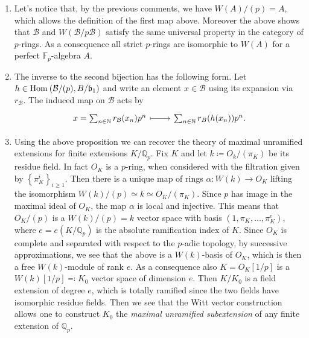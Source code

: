 \begin{rem}[]\leavevmode\vspace{-.2\baselineskip}
\begin{enumerate}
\item Let's notice that, by the previous comments, we have
	$W(A)/ (p) = A$, which allows the definition of the first map above.
	Moreover the above shows that $\mathcal{B}$ and $W(\mathcal{B}/p \mathcal{B})$
	satisfy the same universal property in the category of $p$-rings.
	As a consequence all strict $p$-rings are isomorphic to $W(A)$ for
	a perfect $\mathbb{F}_p$-algebra $A$.

\item The inverse to the second bijection has the following form.
	Let $h \in \operatorname{Hom}_{  } \left( \mathcal{B}/ (p), B/\mathfrak{b}_1 \right)$
	and write an element $x \in \mathcal{B}$ using its expansion via $r_{\mathcal{B}}$.
	The induced map on $\mathcal{B}$ acts by
	\begin{equation*}
	\begin{tikzcd}[row sep = 0ex
		,/tikz/column 1/.append style={anchor=base east}
		,/tikz/column 2/.append style={anchor=base west}]
		x = \sum_{n \in \mathbb{N} }^{  } r_{\mathcal{B}}(x_n) p^n 
		\arrow[r, "", mapsto] & 
		\sum_{n \in \mathbb{N} }^{  } r_B(h(x_n)) p^n
	.\end{tikzcd}
	\end{equation*} 

\item Using the above proposition we can recover the theory of maximal unramified
	extensions for finite extensions $K/\mathbb{Q}_p$.
	Fix $K$ and let $k \coloneqq O_k/ (\pi_K)$ be its residue field.
	In fact $O_K$ is a $p$-ring, when considered with the filtration
	given by $\left\{ \pi_K^i \right\}_{i \geq 1}$.
	Then there is a unique map of rings $\alpha\colon W(k) \to O_K$
	lifting the isomorphism $W(k)/ (p) \simeq k \simeq O_K/ (\pi_K)$.
	Since $p$ has image in the maximal ideal of $O_K$,
	the map $\alpha$ is local and injective.
	This means that $O_K/ (p)$ is a $W(k)/ (p) = k$ vector space
	with basis $\left(1, \pi_K, \ldots, \pi_K^e\right)$,
	where $e = e(K/\mathbb{Q}_p)$ is the absolute ramification
	index of $K$.
	Since $O_K$ is complete and separated with respect to the $p$-adic topology,
	by successive approximations, we see that the above is a
	$W(k)$-basis of $O_K$, which is then a free $W(k)$-module
	of rank $e$.
	As a consequence also $K = O_K[1/p]$ is a $W(k)[1/p] \eqqcolon K_0$
	vector space of dimension $e$.
	Then $K/K_0$ is a field extension of degree $e$, which is totally ramified
	since the two fields have isomorphic residue fields.
	Then we see that the Witt vector construction allows one to
	construct $K_0$ the \emph{maximal unramified subextension} of any
	finite extension of $\mathbb{Q}_p$.


\end{enumerate}
\end{rem}
